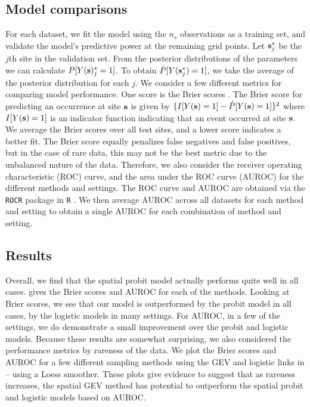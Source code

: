 \documentclass[11pt]{article}
\begin{document}
\subsection{Model comparisons}\label{rbs:cv}

For each dataset, we fit the model using the $n_s$ observations as a training set, and validate the model's predictive power at the remaining grid points.
Let $\mbox{\bf s}^*_j$ be the $j$th site in the validation set.
From the posterior distributions of the parameters we can calculate $P[Y(\mbox{\bf s})^*_j = 1]$.
To obtain $\hat{P}[Y(\mbox{\bf s}^*_j) = 1]$, we take the average of the posterior distribution for each $j$.
We consider a few different metrics for comparing model performance.
One score is the Brier scores \citep[BS]{Gneiting2007}.
The Brier score for predicting an occurrence at site $\mbox{\bf s}$ is given by $\{I[Y(\mbox{\bf s})=1] - \hat{P}[Y(\mbox{\bf s})=1]\}^2$ where $I[Y(\mbox{\bf s}) = 1]$ is an indicator function indicating that an event occurred at site $\mbox{\bf s}$.
We average the Brier scores over all test sites, and a lower score indicates a better fit.
The Brier score equally penalizes false negatives and false positives, but in the case of rare data, this may not be the best metric due to the unbalanced nature of the data.
Therefore, we also consider the receiver operating characteristic (ROC) curve, and the area under the ROC curve (AUROC) for the different methods and settings.
The ROC curve and AUROC are obtained via the \texttt{ROCR} \citep{Sing2005} package in \texttt{R} \citep{Rmanual}.
We then average AUROC across all datasets for each method and setting to obtain a single AUROC for each combination of method and setting.

\subsection{Results} \label{rbs:simresults}

Overall, we find that the spatial probit model actually performs quite well in all cases.
 gives the Brier scores and AUROC for each of the methods.
Looking at Brier scores, we see that our model is outperformed by the probit model in all cases, by the logistic models in many settings.
For AUROC, in a few of the settings, we do demonstrate a small improvement over the probit and logistic models.
Because these results are somewhat surprising, we also considered the performance metrics by rareness of the data.
We plot the Brier scores and AUROC for a few different sampling methods using the GEV and logistic links in  --  using a Loess smoother.
These plots give evidence to suggest that as rareness increases, the spatial GEV method has potential to outperform the spatial probit and logistic models based on AUROC.
\end{document}
